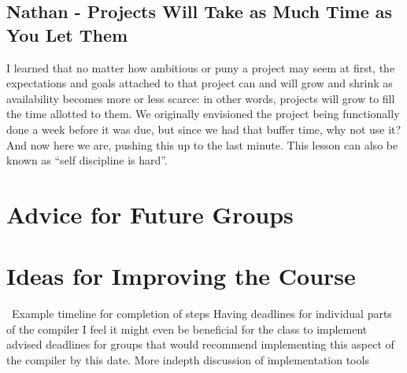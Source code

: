 \subsection{Nathan - Projects Will Take as Much Time as You Let Them}
I learned that no matter how ambitious or puny a project may seem at
first, the expectations and goals attached to that project can and
will grow and shrink as availability becomes more or less scarce: in
other words, projects will grow to fill the time allotted to them. We
originally envisioned the project being functionally done a week
before it was due, but since we had that buffer time, why not use it?
And now here we are, pushing this up to the last minute. This lesson
can also be known as ``self discipline is hard''.

\section{Advice for Future Groups}

\section{Ideas for Improving the Course}
\
Example timeline for completion of steps
Having deadlines for individual parts of the compiler
I feel it might even be beneficial for the class to implement advised deadlines for groups that would recommend implementing this aspect of the compiler by this date.
More indepth discussion of implementation tools
